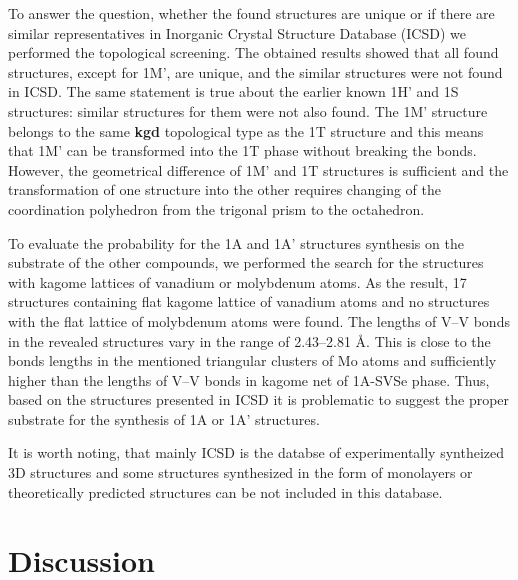 \documentclass[a4paperm]{article}
\begin{document}
To answer the question, whether the found structures are unique or if there are similar representatives in Inorganic Crystal Structure Database (ICSD) we performed the topological screening.
The obtained results showed that all found structures, except for 1M', are unique, and the similar structures were not found in ICSD.
The same statement is true about the earlier known 1H' and 1S structures: similar structures for them were not also found. 
The 1M' structure belongs to the same {\bf kgd} topological type as the 1T structure and this means that 1M' can be transformed into the 1T phase without breaking the bonds.
However, the geometrical difference of 1M' and 1T structures is sufficient and the transformation of one structure into the other requires changing of the coordination polyhedron from the trigonal prism to the octahedron.

To evaluate the probability for the 1A and 1A' structures synthesis on the substrate of the other compounds, we performed the search for the structures with kagome lattices of vanadium or molybdenum atoms.
As the result, 17 structures containing flat kagome lattice of vanadium atoms and no structures with the flat lattice of molybdenum atoms were found. 
The lengths of V--V bonds in the revealed structures vary in the range of 2.43--2.81 \AA.
This is close to the bonds lengths in the mentioned triangular clusters of Mo atoms and sufficiently higher than the lengths of V--V bonds in kagome net of 1A-SVSe phase.
Thus, based on the structures presented in ICSD it is problematic to suggest the proper substrate for the synthesis of 1A or 1A' structures.

It is worth noting, that mainly ICSD is the databse of experimentally syntheized 3D structures and  some structures synthesized in the form of monolayers or theoretically predicted structures can be not included in this database.



\section{Discussion}
\end{document}
